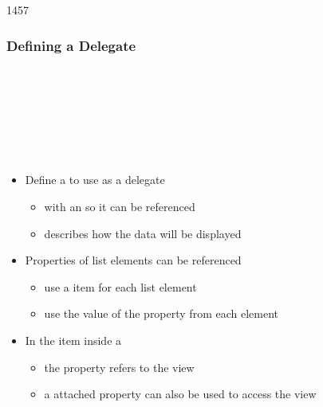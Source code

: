 \begin{slide}{1457}\frametitle{Defining a Delegate}

\begin{qml}
\\
\\
\\
\\
\\
\qtt{~~~~\}}\\
\qtt{\}}
\end{qml}

\begin{itemize}
\item Define a  to use as a delegate
  \begin{itemize}
  \item with an  so it can be referenced
  \item describes how the data will be displayed
  \end{itemize}
\item Properties of list elements can be referenced
  \begin{itemize}
  \item use a  item for each list element
  \item use the value of the  property from each element
  \end{itemize}
\item In the item inside a 
  \begin{itemize}
  \item the  property refers to the view
  \item a  attached property can also be used to access the view
  \end{itemize}
\end{itemize}

\end{slide}


